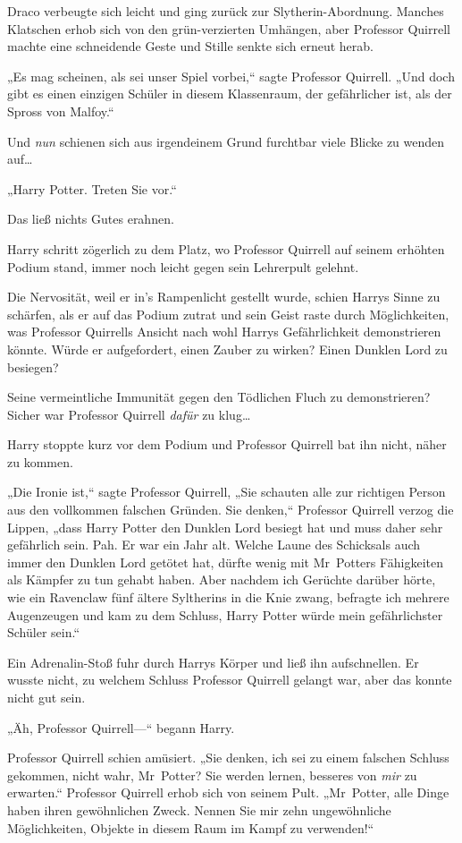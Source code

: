 {Draco verbeugte sich leicht und ging zurück zur Slytherin-Abordnung. Manches Klatschen erhob sich von den grün-verzierten Umhängen, aber Professor Quirrell machte eine schneidende Geste und Stille senkte sich erneut herab.

„Es mag scheinen, als sei unser Spiel vorbei,“ sagte Professor Quirrell. „Und doch gibt es einen einzigen Schüler in diesem Klassenraum, der gefährlicher ist, als der Spross von Malfoy.“

Und \emph{nun} schienen sich aus irgendeinem Grund furchtbar viele Blicke zu wenden auf…

„Harry Potter. Treten Sie vor.“

Das ließ nichts Gutes erahnen.

Harry schritt zögerlich zu dem Platz, wo Professor Quirrell auf seinem erhöhten Podium stand, immer noch leicht gegen sein Lehrerpult gelehnt.

Die Nervosität, weil er in's Rampenlicht gestellt wurde, schien Harrys Sinne zu schärfen, als er auf das Podium zutrat und sein Geist raste durch Möglichkeiten, was Professor Quirrells Ansicht nach wohl Harrys Gefährlichkeit demonstrieren könnte. Würde er aufgefordert, einen Zauber zu wirken? Einen Dunklen Lord zu besiegen?

Seine vermeintliche Immunität gegen den Tödlichen Fluch zu demonstrieren? Sicher war Professor Quirrell \emph{dafür} zu klug…

Harry stoppte kurz vor dem Podium und Professor Quirrell bat ihn nicht, näher zu kommen.

„Die Ironie ist,“ sagte Professor Quirrell, „Sie schauten alle zur richtigen Person aus den vollkommen falschen Gründen. Sie denken,“ Professor Quirrell verzog die Lippen, „dass Harry Potter den Dunklen Lord besiegt hat und muss daher sehr gefährlich sein. Pah. Er war ein Jahr alt. Welche Laune des Schicksals auch immer den Dunklen Lord getötet hat, dürfte wenig mit Mr~Potters Fähigkeiten als Kämpfer zu tun gehabt haben. Aber nachdem ich Gerüchte darüber hörte, wie ein Ravenclaw fünf ältere Syltherins in die Knie zwang, befragte ich mehrere Augenzeugen und kam zu dem Schluss, Harry Potter würde mein gefährlichster Schüler sein.“

Ein Adrenalin-Stoß fuhr durch Harrys Körper und ließ ihn aufschnellen. Er wusste nicht, zu welchem Schluss Professor Quirrell gelangt war, aber das konnte nicht gut sein.

„Äh, Professor Quirrell—“ begann Harry.

Professor Quirrell schien amüsiert. „Sie denken, ich sei zu einem falschen Schluss gekommen, nicht wahr, Mr~Potter? Sie werden lernen, besseres von \emph{mir} zu erwarten.“ Professor Quirrell erhob sich von seinem Pult. „Mr~Potter, alle Dinge haben ihren gewöhnlichen Zweck. Nennen Sie mir zehn ungewöhnliche Möglichkeiten, Objekte in diesem Raum im Kampf zu verwenden!“

}
